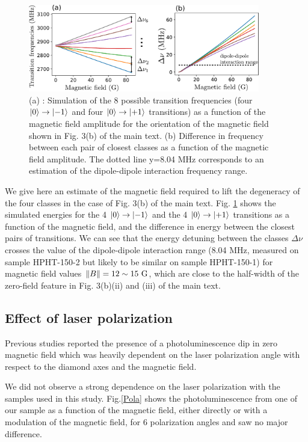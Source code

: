 \documentclass[preprintnumbers,amsmath,amssymb,onecolumn,12pt]{revtex4-2}\usepackage{graphicx}%
\begin{document}
\begin{figure}[h]
\includegraphics[width=0.9\textwidth]{Figures_SI/Fig_splitting}
\caption{(a) : Simulation of the 8 possible transition frequencies (four $\ket{0} \to \ket{-1}$ and four $\ket{0} \to \ket{+1}$ transitions) as a function of the magnetic field amplitude for the orientation of the magnetic field shown in Fig. 3(b) of the main text. (b) Difference in frequency between each pair of closest classes as a function of the magnetic field amplitude. The dotted line y=8.04 MHz corresponds to an estimation of the dipole-dipole interaction frequency range.}
\label{splitting}
\end{figure}
We give here an estimate of the magnetic field required to lift the degeneracy of the four classes in the case of Fig. 3(b) of the main text. Fig. \ref{splitting} shows the simulated energies for the 4 $\ket{0} \to \ket{-1}$ and the 4 $\ket{0} \to \ket{+1}$ transitions as a function of the magnetic field, and the difference in energy between the closest pairs of transitions. We can see that the energy detuning between the classes $\Delta \nu$ crosses the value of the dipole-dipole interaction range (8.04 MHz, measured on sample HPHT-150-2 but likely to be similar on sample HPHT-150-1) for magnetic field values $\norm{B} = 12 \sim 15\ \rm G$, which are close to the half-width of the zero-field feature in Fig. 3(b)(ii) and (iii) of the main text.

\subsection{Effect of laser polarization}
Previous studies \cite{anishchik2015low, filimonenko2020weak} reported the presence of a photoluminescence dip in zero magnetic field which was heavily dependent on the laser polarization angle with respect to the diamond axes and the magnetic field. 

We did not observe a strong dependence on the laser polarization with the samples used in this study. Fig.\ref{Pola} shows the photoluminescence from one of our sample as a function of the magnetic field, either directly or with a modulation of the magnetic field, for 6 polarization angles and saw no major difference. 
\end{document}
